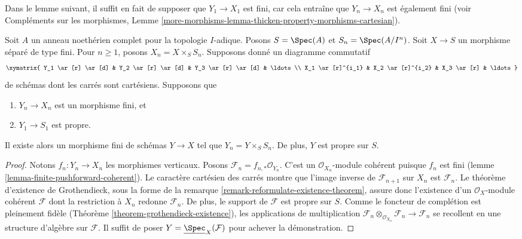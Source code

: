 \noindent
Dans le lemme suivant, il suffit en fait de supposer que $Y_1 \to X_1$
est fini, car cela entraîne que $Y_n \to X_n$ est également fini
(voir Compléments sur les morphismes, Lemme
\ref{more-morphisms-lemma-thicken-property-morphisms-cartesian}).

\begin{lemma}
\label{lemma-algebraize-formal-scheme-finite-over-proper}
Soit $A$ un anneau noethérien complet pour la topologie $I$-adique.
Posons $S = \Spec(A)$ et $S_n = \Spec(A/I^n)$.
Soit $X \to S$ un morphisme séparé de type fini.
Pour $n \geq 1$, posons $X_n = X \times_S S_n$.
Supposons donné un diagramme commutatif
$$
\xymatrix{
Y_1 \ar[r] \ar[d] & Y_2 \ar[r] \ar[d] & Y_3 \ar[r] \ar[d] & \ldots \\
X_1 \ar[r]^{i_1} & X_2 \ar[r]^{i_2} & X_3 \ar[r] & \ldots
}
$$
de schémas dont les carrés sont cartésiens. Supposons que
\begin{enumerate}
\item $Y_n \to X_n$ est un morphisme fini, et
\item $Y_1 \to S_1$ est propre.
\end{enumerate}
Il existe alors un morphisme fini de schémas $Y \to X$ tel que
$Y_n = Y \times_S S_n$. De plus, $Y$ est propre sur $S$.
\end{lemma}

\begin{proof}
Notons $f_n : Y_n \to X_n$ les morphismes verticaux.
Posons $\mathcal{F}_n = f_{n, *}\mathcal{O}_{Y_n}$. C'est
un $\mathcal{O}_{X_n}$-module cohérent puisque $f_n$ est fini
(lemme \ref{lemma-finite-pushforward-coherent}).
Le caractère cartésien des carrés montre que
l'image inverse de $\mathcal{F}_{n + 1}$ sur $X_n$ est $\mathcal{F}_n$.
Le théorème d'existence de Grothendieck, sous la forme de la
remarque \ref{remark-reformulate-existence-theorem},
assure donc l'existence d'un $\mathcal{O}_X$-module cohérent
$\mathcal{F}$ dont la restriction à $X_n$ redonne $\mathcal{F}_n$.
De plus, le support de $\mathcal{F}$ est propre sur $S$.
Comme le foncteur de complétion est pleinement fidèle
(Théorème \ref{theorem-grothendieck-existence}),
les applications de multiplication
$\mathcal{F}_n \otimes_{\mathcal{O}_{X_n}} \mathcal{F}_n \to
\mathcal{F}_n$ se recollent en une structure d'algèbre sur $\mathcal{F}$. Il
suffit de poser $Y = \underline{\Spec}_X(\mathcal{F})$ pour achever la démonstration.
\end{proof}

